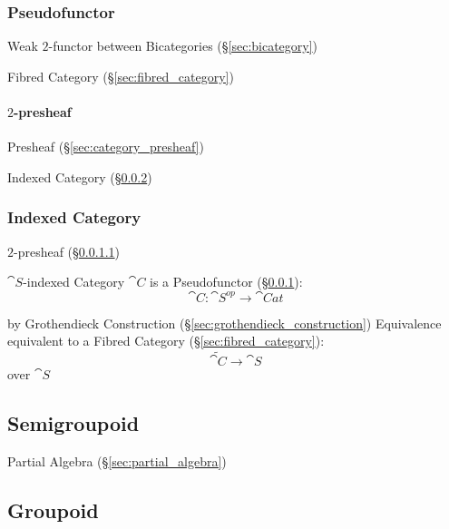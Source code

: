 \subsubsection{Pseudofunctor}\label{sec:pseudofunctor}

Weak $2$-functor between Bicategories (\S\ref{sec:bicategory})

Fibred Category (\S\ref{sec:fibred_category})



\paragraph{$2$-presheaf}\label{sec:2_presheaf}\hfill

Presheaf (\S\ref{sec:category_presheaf})

Indexed Category (\S\ref{sec:indexed_category})



\subsubsection{Indexed Category}\label{sec:indexed_category}

$2$-presheaf (\S\ref{sec:2_presheaf})

$\cat{S}$-indexed Category $\cat{C}$ is a Pseudofunctor
(\S\ref{sec:pseudofunctor}):
\[
  \cat{C}: \cat{S}^{op} \rightarrow \cat{Cat}
\]

by Grothendieck Construction (\S\ref{sec:grothendieck_construction})
Equivalence equivalent to a Fibred Category
(\S\ref{sec:fibred_category}):
\[
  \tilde{\cat{C}} \rightarrow \cat{S}
\]
over $\cat{S}$



\subsection{Semigroupoid}\label{sec:semigroupoid}

Partial Algebra (\S\ref{sec:partial_algebra})



\subsection{Groupoid}\label{sec:groupoid}

